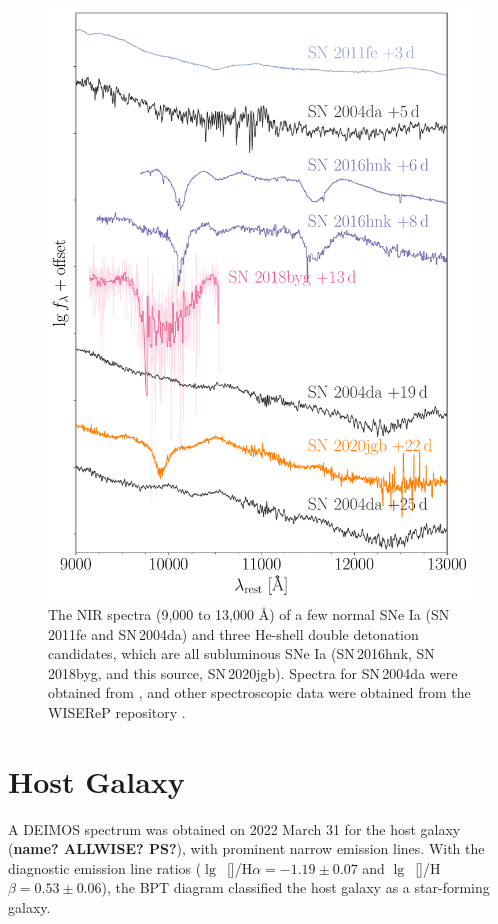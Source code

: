 \documentclass[twocolumn]{aastex631}
\newcommand{\sn}{SN\,2020jgb}
\begin{document}
\begin{figure}
    \centering
    \includegraphics[width=\linewidth]{NIR_spec_comp.pdf}
    \caption{The NIR spectra (9,000 to 13,000 \AA) of a few normal SNe Ia (SN\,2011fe and SN\,2004da) and three He-shell double detonation candidates, which are all subluminous SNe Ia (SN\,2016hnk, SN\,2018byg, and this source, \sn). Spectra for SN\,2004da were obtained from \citet{Marion2009_NIR}, and other spectroscopic data were obtained from the WISEReP repository \citep{wiserep_2012}.}
    \label{fig:NIR_comp}
\end{figure}

\section{Host Galaxy} \label{sec:host}
A DEIMOS spectrum was obtained on 2022 March 31 for the host galaxy ({\bf name? ALLWISE? PS?}), with prominent narrow emission lines. With the diagnostic emission line ratios ($\lg$~[]/H$\alpha=-1.19\pm0.07$ and $\lg$~[]/H$\beta=0.53\pm0.06$), the BPT diagram \citep{BPT_1981, Veilleux_1987} classified the host galaxy as a star-forming galaxy.
\end{document}
